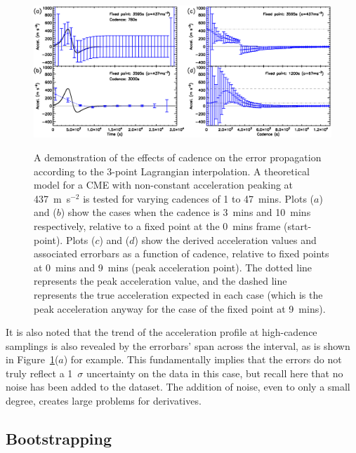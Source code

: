 \documentclass[structabstract]{aa}
\begin{document}
\begin{figure}[!t]
\centering
{\includegraphics[scale=0.55, trim=0 30 0 10, clip=true]{images/fig_cadence_4landscape.eps}}
\caption{A demonstration of the effects of cadence on the error propagation according to the 3-point Lagrangian interpolation. A theoretical model for a CME with non-constant acceleration peaking at 437~m~s$^{-2}$ is tested for varying cadences of 1 to 47~mins. Plots ($a$) and ($b$) show the cases when the cadence is 3~mins and 10~mins respectively, relative to a fixed point at the 0~mins frame (start-point). Plots ($c$) and ($d$) show the derived acceleration values and associated errorbars as a function of cadence, relative to fixed points at 0~mins and 9~mins (peak acceleration point). The dotted line represents the peak acceleration value, and the dashed line represents the true acceleration expected in each case (which is the peak acceleration anyway for the case of the fixed point at 9~mins).}
\label{fig_cadence_4}
\end{figure}

It is also noted that the trend of the acceleration profile at high-cadence samplings is also revealed by the errorbars' span across the interval, as is shown in Figure~\ref{fig_cadence_4}($a$) for example. This fundamentally implies that the errors do not truly reflect a 1~$\sigma$ uncertainty on the data in this case, but recall here that no noise has been added to the dataset. The addition of noise, even to only a small degree, creates large problems for derivatives.

\subsection{Bootstrapping}
\label{subsect:bootstrap}
\end{document}
